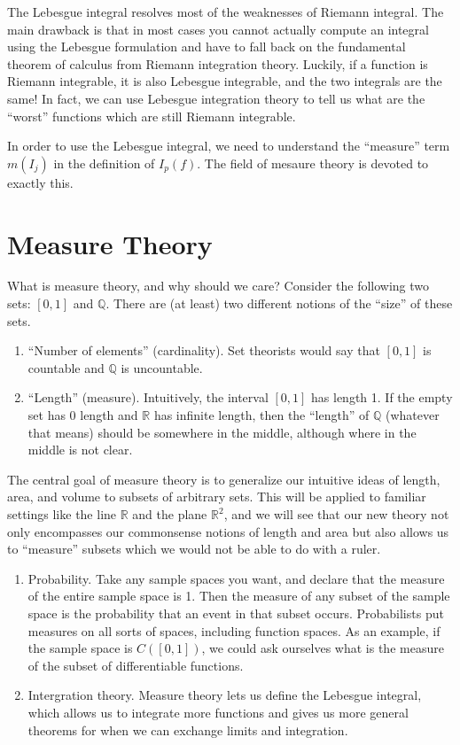 \documentclass[10pt]{article}         %
\theoremstyle{remark}
\newcommand{\R}{\mathbb{R}}
\newcommand{\Q}{\mathbb{Q}}
\begin{document}
The Lebesgue integral resolves most of the weaknesses of Riemann integral. The main drawback is that in most cases you cannot actually compute an integral using the Lebesgue formulation and have to fall back on the fundamental theorem of calculus from Riemann integration theory. Luckily, if a function is Riemann integrable, it is also Lebesgue integrable, and the two integrals are the same! In fact, we can use Lebesgue integration theory to tell us what are the ``worst'' functions which are still Riemann integrable.

In order to use the Lebesgue integral, we need to understand the ``measure'' term $m(I_j)$ in the definition of $I_p(f)$. The field of mesaure theory is devoted to exactly this.

\section{Measure Theory}

What is measure theory, and why should we care? Consider the following two sets: $[0, 1]$ and $\Q$. There are (at least) two different notions of the ``size'' of these sets.
\begin{enumerate}
    \item ``Number of elements'' (cardinality). Set theorists would say that $[0, 1]$ is countable and $\Q$ is uncountable. 
    \item ``Length'' (measure). Intuitively, the interval $[0, 1]$ has length 1. If the empty set has 0 length and $\R$ has infinite length, then the ``length'' of $\Q$ (whatever that means) should be somewhere in the middle, although where in the middle is not clear.
\end{enumerate}

The central goal of measure theory is to generalize our intuitive ideas of length, area, and volume to subsets of arbitrary sets. This will be applied to familiar settings like the line $\R$ and the plane $\R^2$, and we will see that our new theory not only encompasses our commonsense notions of length and area but also allows us to ``measure'' subsets which we would not be able to do with a ruler.

\begin{enumerate}
	\item Probability. Take any sample spaces you want, and declare that the measure of the entire sample space is 1. Then the measure of any subset of the sample space is the probability that an event in that subset occurs. Probabilists put measures on all sorts of spaces, including function spaces. As an example, if the sample space is $C([0, 1])$, we could ask ourselves what is the measure of the subset of differentiable functions.

	\item Intergration theory. Measure theory lets us define the Lebesgue integral, which allows us to integrate more functions and gives us more general theorems for when we can exchange limits and integration.
\end{enumerate}
\end{document}
